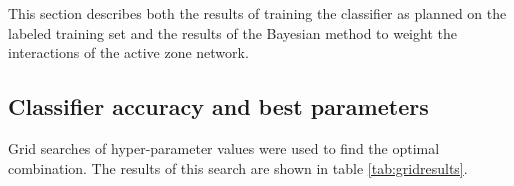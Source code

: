 This section describes both the results of training the classifier as planned on the labeled training set and the results of the Bayesian method to weight the interactions of the active zone network.

\subsection{Classifier accuracy and best parameters}

Grid searches of hyper-parameter values were used to find the optimal combination.
The results of this search are shown in table \ref{tab:gridresults}.

